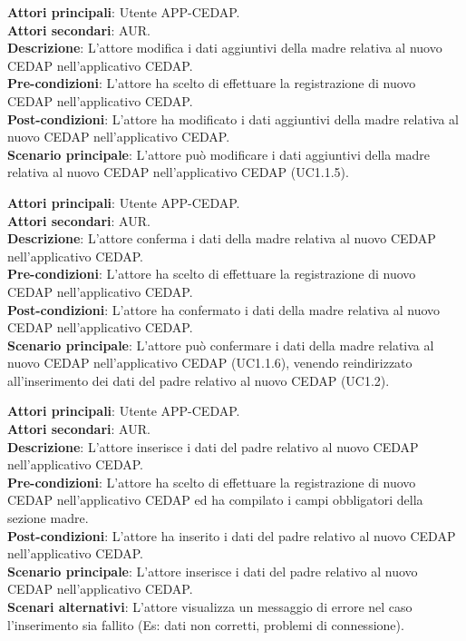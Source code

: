 \documentclass[a4paper]{article}
\newcounter{subsubsubsection}[subsubsection]
\begin{document}
\label{UC1.1.5}

\textbf{Attori principali}: Utente APP-CEDAP.
\\
\textbf{Attori secondari}: AUR.
\\
\textbf{Descrizione}: L'attore modifica i dati aggiuntivi della madre relativa al nuovo CEDAP nell'applicativo CEDAP.
\\
\textbf{Pre-condizioni}: L'attore ha scelto di effettuare la registrazione di nuovo CEDAP nell'applicativo CEDAP.
\\
\textbf{Post-condizioni}: L'attore ha modificato i dati aggiuntivi della madre relativa al nuovo CEDAP nell'applicativo CEDAP.
\\
\textbf{Scenario principale}: L'attore può modificare i dati aggiuntivi della madre relativa al nuovo CEDAP nell'applicativo CEDAP (UC1.1.5).


\label{UC1.1.6}

\textbf{Attori principali}: Utente APP-CEDAP.
\\
\textbf{Attori secondari}: AUR.
\\
\textbf{Descrizione}: L'attore conferma i dati della madre relativa al nuovo CEDAP nell'applicativo CEDAP.
\\
\textbf{Pre-condizioni}: L'attore ha scelto di effettuare la registrazione di nuovo CEDAP nell'applicativo CEDAP.
\\
\textbf{Post-condizioni}: L'attore ha confermato i dati della madre relativa al nuovo CEDAP nell'applicativo CEDAP.
\\
\textbf{Scenario principale}: L'attore può confermare i dati della madre relativa al nuovo CEDAP nell'applicativo CEDAP (UC1.1.6), venendo reindirizzato all'inserimento dei dati del padre relativo al nuovo CEDAP (UC1.2).


\label{UC1.2}

\textbf{Attori principali}: Utente APP-CEDAP.
\\
\textbf{Attori secondari}: AUR.
\\
\textbf{Descrizione}: L'attore inserisce i dati del padre relativo al nuovo CEDAP nell'applicativo CEDAP.
\\
\textbf{Pre-condizioni}: L'attore ha scelto di effettuare la registrazione di nuovo CEDAP nell'applicativo CEDAP ed ha compilato i campi obbligatori della sezione madre.
\\
\textbf{Post-condizioni}: L'attore ha inserito i dati del padre relativo al nuovo CEDAP nell'applicativo CEDAP.
\\
\textbf{Scenario principale}: L'attore inserisce i dati del padre relativo al nuovo CEDAP nell'applicativo CEDAP.
\\
\textbf{Scenari alternativi}: L'attore visualizza un messaggio di errore nel caso l'inserimento sia fallito (Es: dati non corretti, problemi di connessione).
\end{document}
